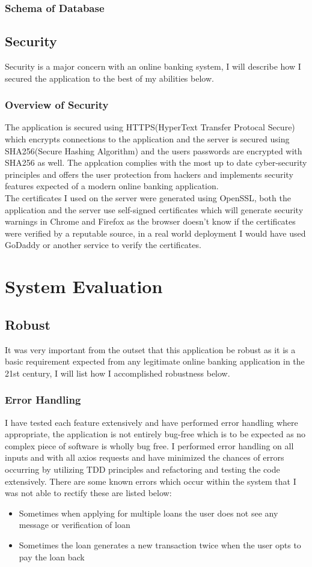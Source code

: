 \subsection{Schema of Database}
\section{Security}
Security is a major concern with an online banking system, I will describe how I secured the application to the best of my abilities below.
\subsection{Overview of Security}
The application is secured using HTTPS(HyperText Transfer Protocal Secure) which encrypts connections to the application and the server
is secured using SHA256(Secure Hashing Algorithm) and the users passwords are encrypted with SHA256 as well.  The applcation complies with the most up to date cyber-security principles and offers the user protection from hackers and implements security features expected of a modern online banking application.
\\
The certificates I used on the server were generated using OpenSSL, both the application and the server use self-signed certificates which will generate security warnings in Chrome and Firefox as the browser doesn't know if the certificates were verified by a reputable source, in a real world deployment I would have used GoDaddy or another service to verify the certificates.
\chapter{System Evaluation}
\section{Robust}
It was very important from the outset that this application be robust as it is a basic requirement expected from any legitimate online banking application in the 21st century, I will list how I accomplished robustness below.
\subsection{Error Handling}
I have tested each feature extensively and have performed error handling where appropriate,
the application is not entirely bug-free which is to be expected as no complex piece of software
is wholly bug free.  I performed error handling on all inputs and with all axios requests and have
minimized the chances of errors occurring by utilizing TDD principles and refactoring and testing
the code extensively.  There are some known errors which occur within the system that I was not able to
rectify these are listed below:
\begin{itemize}
  \item Sometimes when applying for multiple loans the user does not see any message or verification of loan
  \item Sometimes the loan generates a new transaction twice when the user opts to pay the loan back
\end{itemize}
